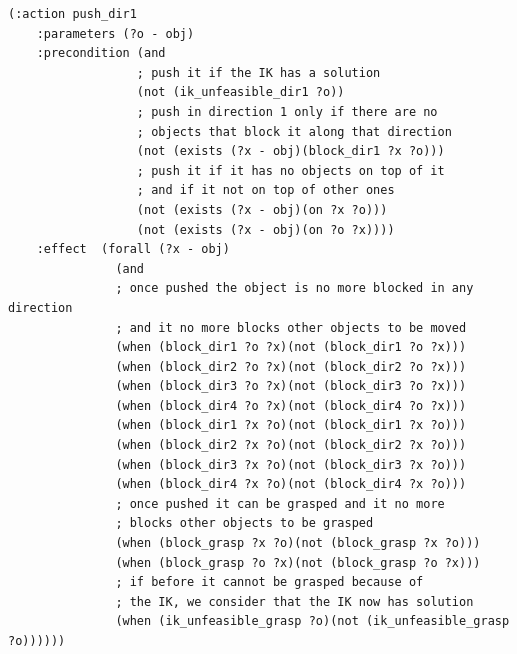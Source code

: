 \lstset{language=pddl}
\begin{lstlisting}[caption={PDDL syntax of the pushing action along direction 1},label=pushPDDL]
(:action push_dir1
    :parameters (?o - obj)
    :precondition (and
                  ; push it if the IK has a solution
                  (not (ik_unfeasible_dir1 ?o)) 
                  ; push in direction 1 only if there are no
                  ; objects that block it along that direction
                  (not (exists (?x - obj)(block_dir1 ?x ?o)))
                  ; push it if it has no objects on top of it
                  ; and if it not on top of other ones
                  (not (exists (?x - obj)(on ?x ?o)))
                  (not (exists (?x - obj)(on ?o ?x))))
    :effect  (forall (?x - obj)
               (and
               ; once pushed the object is no more blocked in any direction
               ; and it no more blocks other objects to be moved
               (when (block_dir1 ?o ?x)(not (block_dir1 ?o ?x)))
               (when (block_dir2 ?o ?x)(not (block_dir2 ?o ?x)))
               (when (block_dir3 ?o ?x)(not (block_dir3 ?o ?x)))
               (when (block_dir4 ?o ?x)(not (block_dir4 ?o ?x)))
               (when (block_dir1 ?x ?o)(not (block_dir1 ?x ?o)))
               (when (block_dir2 ?x ?o)(not (block_dir2 ?x ?o)))
               (when (block_dir3 ?x ?o)(not (block_dir3 ?x ?o)))
               (when (block_dir4 ?x ?o)(not (block_dir4 ?x ?o)))
               ; once pushed it can be grasped and it no more
               ; blocks other objects to be grasped
               (when (block_grasp ?x ?o)(not (block_grasp ?x ?o)))
               (when (block_grasp ?o ?x)(not (block_grasp ?o ?x)))
               ; if before it cannot be grasped because of 
               ; the IK, we consider that the IK now has solution
               (when (ik_unfeasible_grasp ?o)(not (ik_unfeasible_grasp ?o))))))
\end{lstlisting}







